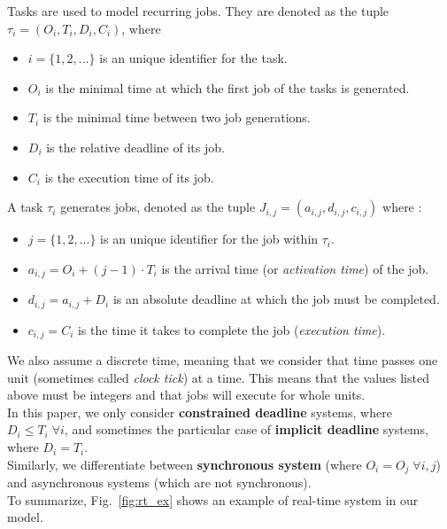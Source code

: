 \documentclass[a4paper,10pt]{article}
\begin{document}
        Tasks are used to model recurring jobs. They are denoted as the tuple $\tau_i = (O_i, T_i, D_i, C_i)$, where
        \begin{itemize}
            \item $i = \{1,2,...\}$ is an unique identifier for the task.
            \item $O_i$ is the minimal time at which the first job of the tasks is generated.
            \item $T_i$ is the minimal time between two job generations.
            \item $D_i$ is the relative deadline of its job.
            \item $C_i$ is the execution time of its job.
        \end{itemize}

        A task $\tau_i$ generates jobs, denoted as the tuple $J_{i,j} = (a_{i, j}, d_{i,j}, c_{i,j})$ where :
        \begin{itemize}
            \item $j = \{1,2,...\}$ is an unique identifier for the job within $\tau_i$.
            \item $a_{i,j} = O_i + (j-1) \cdot T_i$ is the arrival time (or \emph{activation time}) of the job.
            \item $d_{i,j} = a_{i,j} + D_i$ is an absolute deadline at which the job must be completed.
            \item $c_{i,j} = C_i$ is the time it takes to complete the job (\emph{execution time}).
        \end{itemize}

        We also assume a discrete time, meaning that we consider that time passes one unit (sometimes called \emph{clock tick}) at a time. This means that the values listed above must be integers and that jobs will execute for whole units.\\

        In this paper, we only consider \textbf{constrained deadline} systems, where $D_i \leqslant T_i \; \forall i$, and sometimes the particular case of \textbf{implicit deadline} systems, where $D_i = T_i$.\\

        Similarly, we differentiate between \textbf{synchronous system} (where $O_i = O_j \; \forall i,j$) and asynchronous systems (which are not synchronous).\\

        To summarize, Fig.~\ref{fig:rt_ex} shows an example of real-time system in our model.
\end{document}
